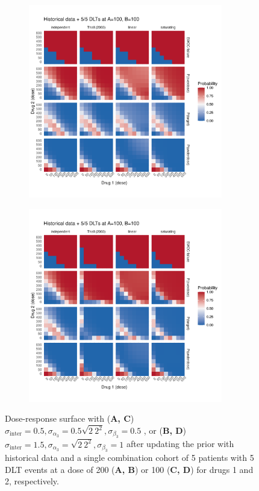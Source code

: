 \documentclass[AMA,STIX1COL]{WileyNJD-v2}
\begin{document}
\begin{figure}
{\begin{subfigure}[t]{.45\linewidth}
{\includegraphics[width=240pt]{figures/ggplot_mu_sd_inter_0_5_Historical_data_+_5_5_DLTs_at_A=100_B=100.pdf}}
\end{subfigure}
\hspace{1mm}
\begin{subfigure}[t]{.45\linewidth}
\caption{} \label{fig:prior_histdata_5_5_100_15}
{\includegraphics[width=240pt]{figures/ggplot_mu_sd_inter_1_5_Historical_data_+_5_5_DLTs_at_A=100_B=100.pdf}}
\end{subfigure}
}
\caption{Dose-response surface with (\textbf{A, C}) $\sigma_\text{inter} = 0.5,\sigma_{\alpha_3} = 0.5 \sqrt{2~2^2}, \sigma_{\beta_3} = 0.5$
, or (\textbf{B, D}) $\sigma_\text{inter} = 1.5, \sigma_{\alpha_3} = \sqrt{2~2^2}, \sigma_{\beta_3} = 1$ after updating the prior with historical data and a single combination cohort of 5 patients with 5 DLT events at a dose of 200 (\textbf{A, B}) or 100 (\textbf{C, D}) for drugs 1 and 2, respectively.}
\label{fig:prior_histdata_5_5}
\end{figure}
\end{document}
